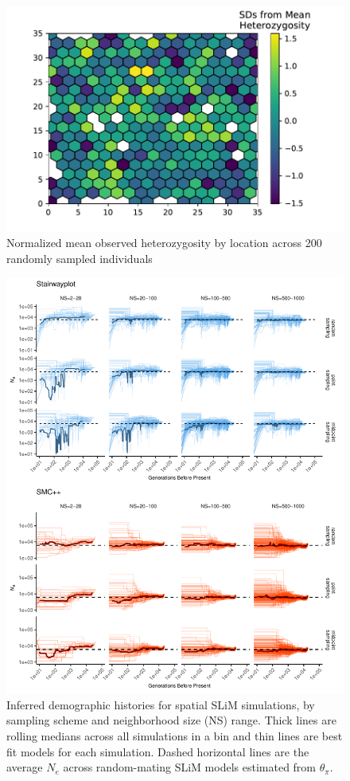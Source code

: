 \documentclass[10pt,twoside,lineno,hidelinks]{preprint}
\begin{document}
\afterpage{\clearpage}
\begin{figure}[p]
\centering
\includegraphics[]{figures/het_z_by_ind.pdf}
\caption{Normalized mean observed heterozygosity by location across 200 randomly sampled individuals}
\label{fig:hetmap}
\end{figure}

\begin{figure}[p]
\centering
\includegraphics[width=\textwidth]{figures/demography_combined.pdf}
\caption{Inferred demographic histories for spatial SLiM simulations, by sampling scheme and neighborhood size (NS) range. Thick lines are rolling medians across all simulations in a bin and thin lines are best fit models for each simulation. Dashed horizontal lines are the average $N_{e}$ across random-mating SLiM models estimated from $\theta_{\pi}$.}
\label{fig:demography_supplement}
\end{figure}
\end{document}
